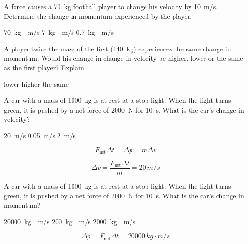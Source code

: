 \documentclass[]{exam}
\begin{document}
\begin{questions}
\question
A force causes a \SI{70}{kg} football player to change his velocity by \SI{10}{m/s}. Determine the change in momentum experienced by the player.

\begin{randomizechoices}
    \correctchoice \SI{70}{kg\cdot m/s}
    \choice \SI{7}{kg\cdot m/s}
    \choice \SI{0.7}{kg\cdot m/s}
\end{randomizechoices}

\question
A player twice the mass of the first (\SI{140}{kg}) experiences the same change in momentum.  Would his change in change in velocity be higher, lower or the same as the first player?  Explain.

\begin{randomizechoices}
    \correctchoice lower
    \choice higher
    \choice the same
\end{randomizechoices}

\question
A car with a mass of \SI{1000}{kg} is at rest at a stop light.  When the light turns green, it is pushed by a net force of \SI{2000}{N} for \SI{10}{s}. What is the car's change in velocity?

\begin{randomizechoices}
    \correctchoice \SI{20}{m/s}
    \choice \SI{0.05}{m/s}
    \choice \SI{2}{m/s}
\end{randomizechoices}

\begin{solution}
\begin{equation*}
    F_\mathrm{net} \Delta t = \Delta p = m \Delta v
\end{equation*}

\begin{equation*}
    \Delta v = \frac{F_\mathrm{net}\Delta t}{m} = \boxed{\SI{20}{m/s}}
\end{equation*}
\end{solution}

\question
A car with a mass of \SI{1000}{kg} is at rest at a stop light. When the light turns green, it is pushed by a net force of \SI{2000}{N} for \SI{10}{s}. What is the car's change in momentum?

\begin{randomizechoices}
    \correctchoice \SI{20000}{kg\cdot m/s}
    \choice \SI{200}{kg\cdot m/s}
    \choice \SI{2000}{kg\cdot m/s}
\end{randomizechoices}

\begin{solution}
\begin{equation*}
    \Delta p = F_\mathrm{net} \Delta t = \boxed{\SI{20000}{kg\cdot m/s}}
\end{equation*}
\end{solution}


\end{questions}
\end{document}
